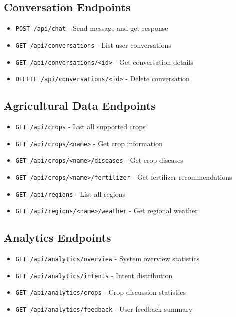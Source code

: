 \documentclass[12pt,a4paper]{article}
\begin{document}
\subsection{Conversation Endpoints}

\begin{itemize}[leftmargin=*]
    \item \texttt{POST /api/chat} - Send message and get response
    \item \texttt{GET /api/conversations} - List user conversations
    \item \texttt{GET /api/conversations/<id>} - Get conversation details
    \item \texttt{DELETE /api/conversations/<id>} - Delete conversation
\end{itemize}

\subsection{Agricultural Data Endpoints}

\begin{itemize}[leftmargin=*]
    \item \texttt{GET /api/crops} - List all supported crops
    \item \texttt{GET /api/crops/<name>} - Get crop information
    \item \texttt{GET /api/crops/<name>/diseases} - Get crop diseases
    \item \texttt{GET /api/crops/<name>/fertilizer} - Get fertilizer recommendations
    \item \texttt{GET /api/regions} - List all regions
    \item \texttt{GET /api/regions/<name>/weather} - Get regional weather
\end{itemize}

\subsection{Analytics Endpoints}

\begin{itemize}[leftmargin=*]
    \item \texttt{GET /api/analytics/overview} - System overview statistics
    \item \texttt{GET /api/analytics/intents} - Intent distribution
    \item \texttt{GET /api/analytics/crops} - Crop discussion statistics
    \item \texttt{GET /api/analytics/feedback} - User feedback summary
\end{itemize}
\end{document}
